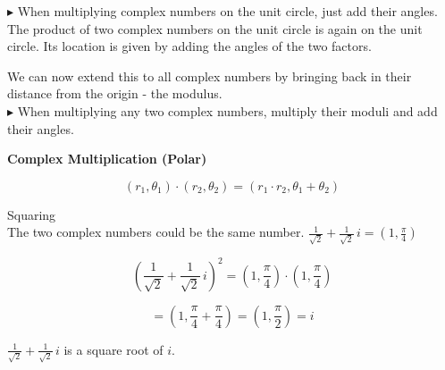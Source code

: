 \documentclass{ximera}
\begin{document}
 

\textcolor{red!80!black}{$\blacktriangleright$} When multiplying complex numbers on the unit circle, just add their angles. \\




The product of two complex numbers on the unit circle is again on the unit circle. Its location is given by adding the angles of the two factors.


We can now extend this to all complex numbers by bringing back in their distance from the origin - the modulus. \\




\textcolor{red!80!black}{$\blacktriangleright$} When multiplying any two complex numbers, multiply their moduli and add their angles.



\begin{theorem}  \textbf{\textcolor{green!50!black}{Complex Multiplication (Polar)}}

\[  (r_1, \theta_1) \cdot (r_2, \theta_2) = (r_1 \cdot r_2, \theta_1 + \theta_2)              \]


\end{theorem}




\begin{example}  Squaring \\


The two complex numbers could be the same number. $\frac{1}{\sqrt{2}} + \frac{1}{\sqrt{2}} \, i = \left(1, \frac{\pi}{4} \right)$


\[
\left( \frac{1}{\sqrt{2}} + \frac{1}{\sqrt{2}} \, i \right)^2 = \left(1, \frac{\pi}{4} \right) \cdot \left(1, \frac{\pi}{4} \right)
\]

\[
= \left(1, \frac{\pi}{4} + \frac{\pi}{4} \right) = \left( 1, \frac{\pi}{2} \right) = i
\]




$\frac{1}{\sqrt{2}} + \frac{1}{\sqrt{2}} \, i$ is a square root of $i$.


\end{example}
\end{document}
